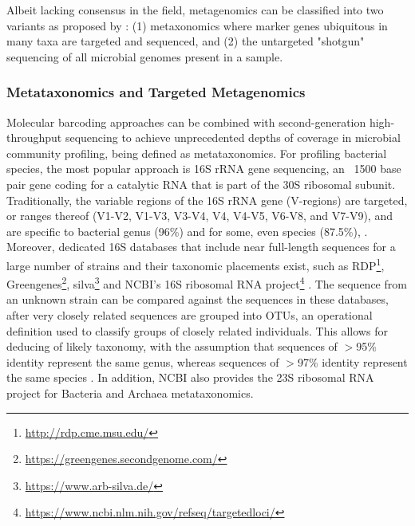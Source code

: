 Albeit lacking consensus in the field, metagenomics can be classified into two variants as proposed by \citep{marchesi_vocabulary_2015}: (1) metaxonomics where marker genes ubiquitous in many taxa are targeted and sequenced, and (2) the untargeted "shotgun" sequencing of all microbial genomes present in a sample. 

\subsubsection{Metataxonomics and Targeted Metagenomics} \label{sssec:_intro_metataxonomics}

Molecular barcoding approaches can be combined with second-generation high-throughput sequencing to achieve unprecedented depths of coverage in microbial community profiling, being defined as metataxonomics. 
For profiling bacterial species, the most popular approach is 16S \ac{rRNA} gene sequencing, an ~1500 base pair gene coding for a catalytic RNA that is part of the 30S ribosomal subunit. 
Traditionally, the variable regions of the 16S \ac{rRNA} gene (V-regions) are targeted, or ranges thereof (V1-V2, V1-V3, V3-V4, V4, V4-V5, V6-V8, and V7-V9), and are specific to bacterial genus (96\%) and for some, even species (87.5\%), \citep{srinivasan_use_2015, abellan-schneyder_primer_2021}. 
Moreover, dedicated 16S databases that include near full-length sequences for a large number of strains and their taxonomic placements exist, such as RDP\footnote{\url{http://rdp.cme.msu.edu/}}, Greengenes\footnote{\url{https://greengenes.secondgenome.com/}}, silva\footnote{\url{https://www.arb-silva.de/}} and NCBI's 16S ribosomal RNA project\footnote{\url{https://www.ncbi.nlm.nih.gov/refseq/targetedloci/}} \citep{cole_ribosomal_2009, desantis_greengenes_2006, pruesse_silva_2007}. 
The sequence from an unknown strain can be compared against the sequences in these databases, after very closely related sequences are grouped into \ac{OTUs},  an operational definition used to classify groups of closely related individuals. This allows for deducing of likely taxonomy, with the assumption that sequences of $>$95\% identity represent the same genus, whereas sequences of $>$97\% identity represent the same species \citep{schloss_introducing_2005}. 
In addition, NCBI also provides the 23S ribosomal RNA project for Bacteria and Archaea metataxonomics. 


